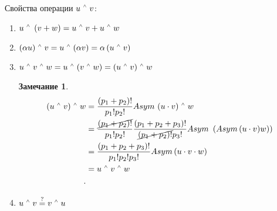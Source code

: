 \documentclass{book}
\let\latexwedge\wedge
\def\wedge{\,\raisebox{0.5ex}{\ensuremath{\scriptscriptstyle\latexwedge}\,}}
\theoremstyle{definition}
\newtheorem*{note}{Замечание}
\begin{document}
Свойства операции $u\wedge v$:
 \begin{enumerate}
     \item  $u\wedge\left( v+w \right)  = u\wedge v + u\wedge w$
     \item $(\alpha u)\wedge v = u\wedge (\alpha v) = \alpha \left( u\wedge v \right) $
     \item $u\wedge v \wedge w = u\wedge (v\wedge w) = (u\wedge v)\wedge w$
      \begin{note}
          \begin{align*}
              (u\wedge v)\wedge w &= \frac{(p_1+p_2)!}{p_1!p_2!}Asym~(u\cdot v) \wedge w\\
                                  &= \frac{\cancel{(p_1+p_2)!}}{p_1!p_2!}\frac{\left( p_1+p_2 +p_3\right) !}{\cancel{(p_1+p_2)!}p_3!}Asym~\left( Asym\left( u\cdot v)w \right)  \right)  \\
                                  &= \frac{\left( p_1+p_2+p_3 \right) !}{p_1!p_2!p_3!}Asym\left( u\cdot v\cdot w \right) \\
                                  &= u\wedge v\wedge w \\
         .\end{align*}
     \end{note}
 \item $u\wedge v \overset ? = v\wedge u$


\end{enumerate}
\end{document}
